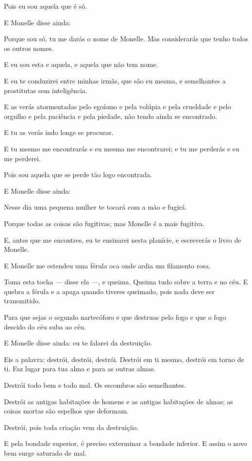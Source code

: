 Pois eu sou aquela que é só.

E Monelle disse ainda:

Porque sou só, tu me darás o nome de Monelle. Mas considerarás que
tenho todos os outros nomes.

E eu sou esta e aquela, e aquela que não tem nome.

E eu te conduzirei entre minhas irmãs, que são eu mesma, e semelhantes
a prostitutas sem inteligência.

E as verás atormentadas pelo egoísmo e pela volúpia e pela crueldade e
pelo orgulho e pela paciência e pela piedade, não tendo ainda se
encontrado.

E tu as verás indo longe se procurar.

E tu mesmo me encontrarás e eu mesma me encontrarei; e tu me perderás e
eu me perderei.

Pois sou aquela que se perde tão logo encontrada.

E Monelle disse ainda:

Nesse dia uma pequena mulher te tocará com a mão e fugirá.

Porque todas as coisas são fugitivas; mas Monelle é a mais fugitiva.

E, antes que me encontres, eu te ensinarei nesta planície, e escreverás
o livro de Monelle.

E Monelle me estendeu uma férula oca onde ardia um filamento rosa.

Toma esta tocha --- disse ela ---, e queima. Queima tudo sobre a terra e no
céu. E quebra a férula e a apaga quando tiveres queimado, pois nada deve
ser transmitido.

Para que sejas o segundo nartecóforo e que destruas pelo fogo e que o
fogo descido do céu suba ao céu.  

E Monelle disse ainda: eu te falarei da destruição.

Eis a palavra: destrói, destrói, destrói. Destrói em ti mesmo, destrói
em torno de ti. Faz lugar para tua alma e para as outras almas.

Destrói todo bem e todo mal. Os escombros são semelhantes.

Destrói as antigas habitações de homens e as antigas habitações de
almas; as coisas mortas são espelhos que deformam.

Destrói, pois toda criação vem da destruição.

E pela bondade superior, é preciso exterminar a bondade inferior. E
assim o novo bem surge saturado de mal.

